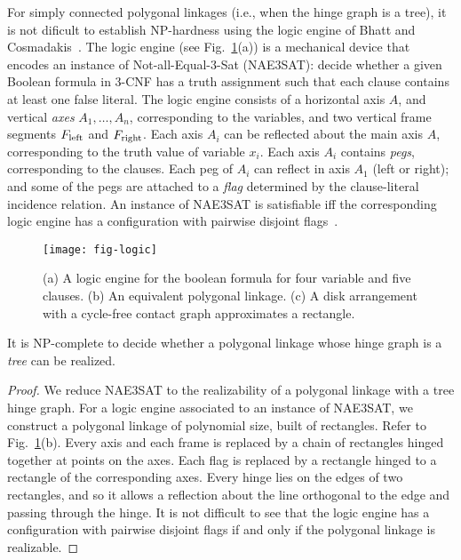 \documentclass{llncs}
\begin{document}
For simply connected polygonal linkages (i.e., when the hinge graph is a tree), it is not dificult to establish NP-hardness using
the logic engine of Bhatt and Cosmadakis~\cite{BC87,BET+99}. The logic engine (see Fig.~\ref{fig:logic}(a)) is a mechanical device that encodes an instance of {\sc Not-all-Equal-3-Sat} (NAE3SAT): decide whether a given Boolean formula in 3-CNF has a truth assignment such that each clause contains at least one false literal. The logic engine consists of a horizontal axis $A$, and vertical \emph{axes} $A_1,\ldots , A_n$,  corresponding to the variables, and two vertical frame segments $F_{\rm left}$ and $F_{\rm right}$. Each axis $A_i$ can be reflected about the main axis $A$, corresponding to the truth value of variable $x_i$. Each axis $A_i$ contains \emph{pegs}, corresponding to the clauses. Each peg of $A_i$ can reflect in axis $A_1$ (left or right); and some of the pegs are attached to a \emph{flag} determined by the clause-literal incidence relation. An instance of NAE3SAT is satisfiable iff the corresponding logic engine has a configuration with pairwise disjoint flags~\cite{BC87,BET+99}.

\begin{figure}[htbp]
  \centering
 \texttt{[image: fig-logic]}
\caption{\small (a) A logic engine for the boolean formula for four variable and five clauses.
(b) An equivalent polygonal linkage.
(c) A disk arrangement with a cycle-free contact graph approximates a rectangle.}
  \label{fig:logic}
\end{figure}

\begin{theorem}\label{thm:hinge1}
It is NP-complete to decide whether a polygonal linkage whose hinge graph is a \emph{tree} can be realized.
\end{theorem}
\begin{proof}
We reduce NAE3SAT to the realizability of a polygonal linkage with a tree hinge graph. For a logic engine associated to an instance of NAE3SAT, we construct a polygonal linkage of polynomial size, built of rectangles. Refer to Fig.~\ref{fig:logic}(b). Every axis and each frame is replaced by a chain of rectangles hinged together at points on the axes. Each flag is replaced by a rectangle hinged to a rectangle of the corresponding axes. Every hinge lies on the edges of two rectangles, and so it allows a reflection about the line orthogonal to the edge and passing through the hinge. It is not difficult to see that the logic engine has a configuration with pairwise disjoint flags if and only if the polygonal linkage is realizable.
\end{proof}
\end{document}

